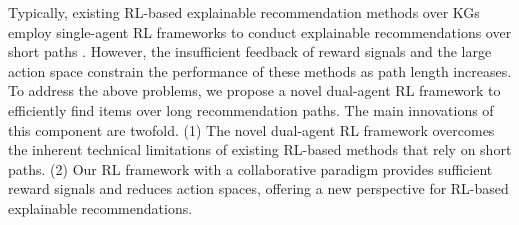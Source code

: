 \documentclass[conference]{IEEEtran}
\begin{document}

Typically, existing RL-based explainable recommendation methods over KGs employ single-agent RL frameworks to conduct explainable recommendations over short paths \cite{PGPR} \cite{ADAC}. However, the insufficient feedback of reward signals and the large action space constrain the performance of these methods as path length increases. To address the above problems, we propose a novel dual-agent RL framework to efficiently find items over long recommendation paths. The main innovations of this component are twofold. (1) The novel dual-agent RL framework overcomes the inherent technical limitations of existing RL-based methods that rely on short paths. (2) Our RL framework with a collaborative paradigm provides sufficient reward signals and reduces action spaces, offering a new perspective for RL-based explainable recommendations. 


\end{document}

